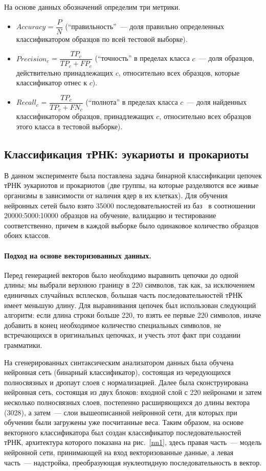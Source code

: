 На основе данных обозначений определим три метрики.
\begin{itemize}
    \item $Accuracy$ = $\dfrac{P}{N}$ (``правильность''~--- доля правильно определенных классификатором образцов по всей тестовой выборке).
    \item $Precision_{c}$ = $\dfrac{TP_{c}}{TP_{c} + FP_{c}}$ (``точность'' в пределах класса $c$~--- доля образцов, действительно принадлежащих $c$, относительно всех образцов, которые классификатор отнес к $c$).
    \item $Recall_{c}$ = $\dfrac{TP_{c}}{TP_{c} + FN_{c}}$  (``полнота'' в пределах класса $c$~--- доля найденных классификатором образцов, принадлежащих $c$, относительно всех образцов этого класса в тестовой выборке).
\end{itemize}


\subsection{Классификация тРНК: эукариоты и прокариоты}
В данном эксперименте была поставлена задача бинарной классификации цепочек тРНК эукариотов и прокариотов (две группы, на которые разделяются все живые организмы в зависимости от наличия ядер в их клетках). Для обучения нейронных сетей было взято 35000 последовательностей из баз~\cite{trnadb1,trnadb2} в соотношении 20000:5000:10000  образцов на обучение, валидацию и тестирование соответственно, причем в каждой выборке было одинаковое количество образцов обоих классов.

\paragraph{Подход на основе векторизованных данных.} Перед генерацией векторов было необходимо выравнить цепочки до одной длины; мы выбрали верхнюю границу в 220 символов, так как, за исключением единичных случайных всплесков, большая часть последовательностей тРНК имеет меньшую длину. Для выравнивания цепочек был использован следующий алгоритм: если длина строки больше 220, то взять ее первые 220 символов, иначе добавить в конец необходимое количество специальных символов, не встречающихся в оригинальных цепочках, и учесть этот факт при создании грамматики.

На сгенерированных синтаксическим анализатором данных была обучена нейронная сеть (бинарный классификатор), состоящая из чередующихся полносвязных и дропаут слоев с нормализацией. Далее была сконструирована нейронная сеть, состоящая из двух блоков: входной слой с 220 нейронами и затем несколько полносвязных слоев, постепенно расширяющихся до длины вектора (3028), а затем~--- слои вышеописанной нейронной сети, для которых при обучении были загружены уже посчитанные веса. Таким образом, на основе векторного классификатора был создан классификатор последовательностей тРНК, архитектура которого показана на рис.~\ref{nn1}, здесь правая часть~--- модель нейронной сети, принимающей на вход векторизованные данные, а левая часть~--- надстройка, преобразующая нуклеотидную последовательность в вектор.

